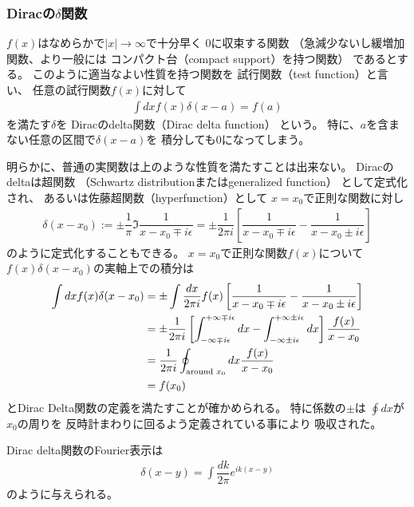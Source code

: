 \subsubsection{Diracの$\delta$関数}

$f(x)$はなめらかで$|x| \to \infty$で十分早く
$0$に収束する関数
（急減少ないし緩増加関数、より一般には
コンパクト台（compact support）を持つ関数）
であるとする。
このように適当なよい性質を持つ関数を
試行関数（test function）と言い、
任意の試行関数$f(x)$に対して
\begin{align}
    \int dx f(x) \delta(x - a)
    =
    f(a)
\end{align}
を満たす$\delta$を
Diracのdelta関数（Dirac delta function）
という。
特に、$a$を含まない任意の区間で$\delta(x - a)$を
積分しても$0$になってしまう。

明らかに、普通の実関数は上のような性質を満たすことは出来ない。
Diracのdeltaは超関数
（Schwartz distributionまたはgeneralized function）
として定式化され、
あるいは佐藤超関数（hyperfunction）として
$x = x_0$で正則な関数に対し
\begin{align}
    \delta(x - x_0)
:=
    \pm
    \dfrac{1}{\pi}
    \Im
    \dfrac{1}{x - x_0 \mp i \epsilon}
=
    \pm
    \dfrac{1}{2 \pi i}
    \left[
        \dfrac{1}{x - x_0 \mp i \epsilon}
        -
        \dfrac{1}{x - x_0 \pm i \epsilon}
    \right]
\end{align}
のように定式化することもできる。
$x = x_0$で正則な関数$f(x)$について
$f(x) \delta(x - x_0)$の実軸上での積分は
\begin{align}
    \int dx
    f(x) \delta(x - x_0)
&=
    \pm
    \int
    \dfrac{dx}{2 \pi i}
    f(x)
    \left[
        \dfrac{1}{x - x_0 \mp i \epsilon}
        -
        \dfrac{1}{x - x_0 \pm i \epsilon}
    \right]
\notag\\&
=
    \pm
    \dfrac{1}{2 \pi i}
    \left[
    \int_{- \infty \mp i \epsilon}
        ^{+ \infty \mp i \epsilon}
        dx
    -
    \int_{- \infty \pm i \epsilon}
        ^{+ \infty \pm i \epsilon}
        dx
    \right]
    \dfrac{f(x)}{x - x_0}
\notag\\&
=
    \dfrac{1}{2 \pi i}
    \oint_{\text{around } x_0}
        dx
    \dfrac{f(x)}{x - x_0}
\notag\\&
=
    f(x_0)
\end{align}
とDirac Delta関数の定義を満たすことが確かめられる。
特に係数の$\pm$は
$\oint dx$が$x_0$の周りを
反時計まわりに回るよう定義されている事により
吸収された。

Dirac delta関数のFourier表示は
\begin{align}
    \delta(x-y)
    =
    \int
    \dfrac{dk}{2\pi}
    e^{ik(x-y)}
\label{dirac delta fourier representation}
\end{align}
のように与えられる。

